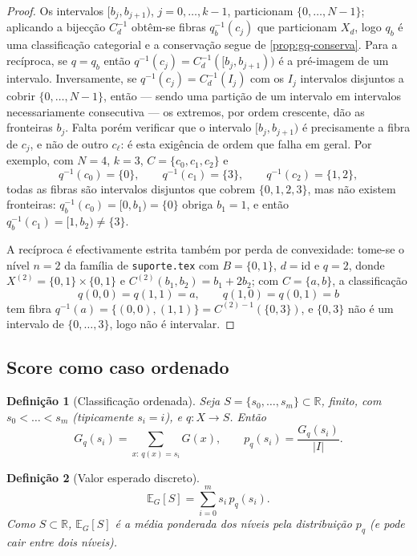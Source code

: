 \documentclass[11pt,a4paper]{article}
\newtheorem{definicao}{Definição}
\begin{document}
\begin{proof}
Os intervalos \([b_j,b_{j+1})\), \(j=0,\dots,k-1\), particionam
\(\{0,\dots,N-1\}\); aplicando a bijecção \(C_d^{-1}\) obtêm-se fibras
\(q_b^{-1}(c_j)\) que particionam \(X_d\), logo \(q_b\) é uma classificação
categorial e a conservação segue de \ref{prop:gq-conserva}. Para a recíproca,
se \(q=q_b\) então \(q^{-1}(c_j)=C_d^{-1}([b_j,b_{j+1}))\) é a pré-imagem de um
intervalo. Inversamente, se \(q^{-1}(c_j)=C_d^{-1}(I_j)\) com os \(I_j\)
intervalos disjuntos a cobrir \(\{0,\dots,N-1\}\), então --- sendo uma
partição de um intervalo em intervalos necessariamente consecutiva --- os
extremos, por ordem crescente, dão as fronteiras \(b_j\). Falta porém
verificar que o intervalo \([b_j,b_{j+1})\) é precisamente a fibra de \(c_j\),
e não de outro \(c_\ell\): é esta exigência de ordem que falha em geral.
Por exemplo, com \(N=4\), \(k=3\), \(C=\{c_0,c_1,c_2\}\) e
\[
q^{-1}(c_0)=\{0\},\qquad q^{-1}(c_1)=\{3\},\qquad q^{-1}(c_2)=\{1,2\},
\]
todas as fibras são intervalos disjuntos que cobrem \(\{0,1,2,3\}\), mas não
existem fronteiras: \(q_b^{-1}(c_0)=[0,b_1)=\{0\}\) obriga \(b_1=1\), e então
\(q_b^{-1}(c_1)=[1,b_2)\neq\{3\}\).

A recíproca é
efectivamente estrita também por perda de convexidade: tome-se o
nível \(n=2\) da família de \texttt{suporte.tex} com \(B=\{0,1\}\),
\(d=\mathrm{id}\) e \(q=2\), donde \(X^{(2)}=\{0,1\}\times\{0,1\}\) e
\(C^{(2)}(b_1,b_2)=b_1+2b_2\); com \(C=\{a,b\}\), a classificação
\[
q(0,0)=q(1,1)=a,\qquad q(1,0)=q(0,1)=b
\]
tem fibra \(q^{-1}(a)=\{(0,0),(1,1)\}=C^{(2)-1}(\{0,3\})\), e \(\{0,3\}\)
não é um intervalo de \(\{0,\dots,3\}\), logo não é intervalar.
\end{proof}

\subsection{Score como caso ordenado}

\begin{definicao}[Classificação ordenada]
\label{def:q-score}
Seja \(S=\{s_0,\dots,s_m\}\subset\mathbb R\), finito, com
\(s_0<\dots<s_m\) (tipicamente \(s_i=i\)), e \(q\colon X\to S\). Então
\[
G_q(s_i)=\sum_{x:\,q(x)=s_i}G(x),\qquad
p_q(s_i)=\frac{G_q(s_i)}{\lvert I\rvert}.
\]
\end{definicao}

\begin{definicao}[Valor esperado discreto]
\label{def:esperado}
\[
\mathbb E_G[S]=\sum_{i=0}^{m}s_i\,p_q(s_i).
\]
Como \(S\subset\mathbb R\), \(\mathbb E_G[S]\) é a média ponderada dos níveis
pela distribuição \(p_q\) (e pode cair entre dois níveis).
\end{definicao}
\end{document}
